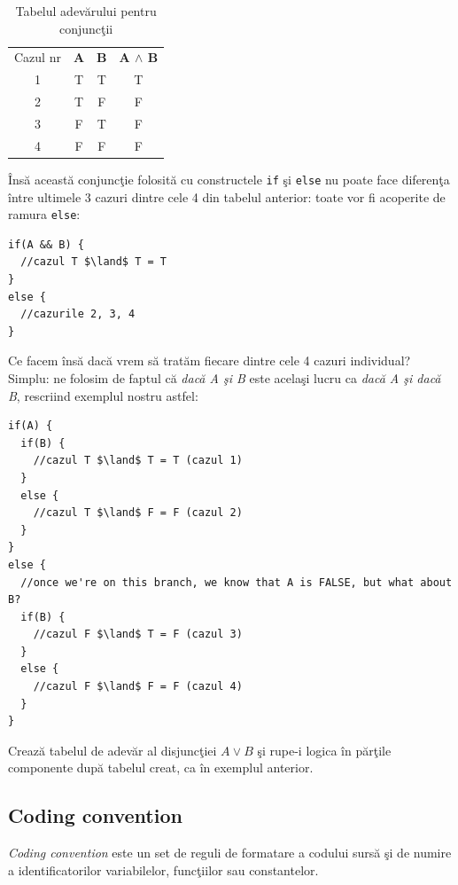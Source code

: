 \begin{table}[h!]
  \begin{center}
  \begin{tabular}{cccc}
  Cazul nr & \textbf{A} & \textbf{B} & \textbf{A $\land$ B}\\
  1 & T & T & T\\
  2 & T & F & F\\
  3 & F & T & F\\
  4 & F & F & F
  \end{tabular}
  \end{center}
  \caption{Tabelul adevărului pentru conjuncţii}
  \label{tbl:truth table and}
\end{table}

Însă această conjuncţie folosită cu constructele \texttt{if} şi
\texttt{else} nu poate face diferenţa între ultimele 3 cazuri dintre
cele 4 din tabelul anterior: toate vor fi acoperite de ramura \texttt{else}:

\begin{lstlisting}[mathescape]
if(A && B) {
  //cazul T $\land$ T = T
}
else {
  //cazurile 2, 3, 4
}
\end{lstlisting}
Ce facem însă dacă vrem să tratăm fiecare dintre cele 4 cazuri individual?
Simplu: ne folosim de faptul că \textit{dacă A şi B} este acelaşi lucru ca
\textit{dacă A şi dacă B}, rescriind exemplul nostru astfel:
\begin{lstlisting}[mathescape]
if(A) {
  if(B) {
    //cazul T $\land$ T = T (cazul 1)
  }
  else {
    //cazul T $\land$ F = F (cazul 2)
  }
}
else {
  //once we're on this branch, we know that A is FALSE, but what about B?
  if(B) {
    //cazul F $\land$ T = F (cazul 3)
  }
  else {
    //cazul F $\land$ F = F (cazul 4)
  }
}
\end{lstlisting}

\begin{Exercise}[title={Breaking down the logic of a disjunction},difficulty=1]
Crează tabelul de adevăr al disjuncţiei $A \lor B$ şi rupe-i logica în părţile
componente după tabelul creat, ca în exemplul anterior.
\end{Exercise}

\subsection{Coding convention}
\textsl{Coding convention} este un set de reguli de formatare a codului sursă
şi de numire a identificatorilor variabilelor, funcţiilor sau constantelor.

